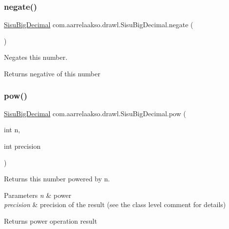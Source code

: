 \subsubsection{\texorpdfstring{negate()}{negate()}}
{\footnotesize\ttfamily \hyperlink{classcom_1_1aarrelaakso_1_1drawl_1_1_sisu_big_decimal}{Sisu\+Big\+Decimal} com.\+aarrelaakso.\+drawl.\+Sisu\+Big\+Decimal.\+negate (\begin{DoxyParamCaption}{ }\end{DoxyParamCaption})\hspace{0.3cm}{\ttfamily [protected]}}



Negates this number. 

\begin{DoxyReturn}{Returns}
negative of this number 
\end{DoxyReturn}
\mbox{\label{classcom_1_1aarrelaakso_1_1drawl_1_1_sisu_big_decimal_aa3be41b7881201bb4184ef30b8ee4ad9}} 
\subsubsection{\texorpdfstring{pow()}{pow()}}
{\footnotesize\ttfamily \hyperlink{classcom_1_1aarrelaakso_1_1drawl_1_1_sisu_big_decimal}{Sisu\+Big\+Decimal} com.\+aarrelaakso.\+drawl.\+Sisu\+Big\+Decimal.\+pow (\begin{DoxyParamCaption}\item[{int}]{n,  }\item[{int}]{precision }\end{DoxyParamCaption})\hspace{0.3cm}{\ttfamily [protected]}}



Returns this number powered by n. 


\begin{DoxyParams}{Parameters}
{\em n} & power \\
\hline
{\em precision} & precision of the result (see the class level comment for details) \\
\hline
\end{DoxyParams}
\begin{DoxyReturn}{Returns}
power operation result 
\end{DoxyReturn}
\mbox{\label{classcom_1_1aarrelaakso_1_1drawl_1_1_sisu_big_decimal_a5d192b65bffd1955bb670588ece9ba0e}} 
